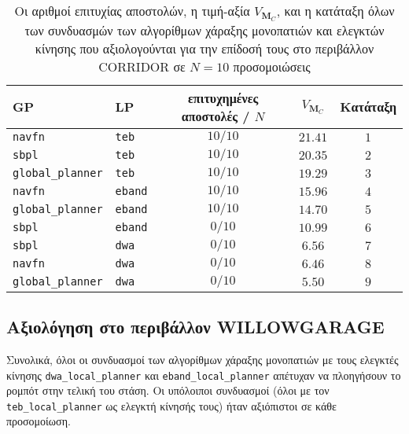\begin{table}\centering
\renewcommand{\arraystretch}{1.3}
\begin{tabular}{llccc}
  GP                        & LP              & επιτυχημένες αποστολές / $N$ & $V_{\bm{M}_C}$ & Κατάταξη \\ \toprule
  \texttt{navfn}            & \texttt{teb}    & $10/10$                      & $21.41$        & $1$      \\
  \texttt{sbpl}             & \texttt{teb}    & $10/10$                      & $20.35$        & $2$      \\
  \texttt{global\_planner}  & \texttt{teb}    & $10/10$                      & $19.29$        & $3$      \\
  \texttt{navfn}            & \texttt{eband}  & $10/10$                      & $15.96$        & $4$      \\
  \texttt{global\_planner}  & \texttt{eband}  & $10/10$                      & $14.70$        & $5$      \\
  \texttt{sbpl}             & \texttt{eband}  & $0/10$                       & $10.99$        & $6$      \\
  \texttt{sbpl}             & \texttt{dwa}    & $0/10$                       & $6.56$         & $7$      \\
  \texttt{navfn}            & \texttt{dwa}    & $0/10$                       & $6.46$         & $8$      \\
  \texttt{global\_planner}  & \texttt{dwa}    & $0/10$                       & $5.50$         & $9$      \\ \bottomrule
\end{tabular}
\caption{\small Οι αριθμοί επιτυχίας αποστολών, η τιμή-αξία $V_{\bm{M}_C}$, και
         η κατάταξη όλων των συνδυασμών των αλγορίθμων χάραξης μονοπατιών και
         ελεγκτών κίνησης που αξιολογούνται για την επίδοσή τους στο
         περιβάλλον CORRIDOR σε $N=10$ προσομοιώσεις}
\label{tbl:rank_corridor}
\end{table}


\subsection{Αξιολόγηση στο περιβάλλον WILLOWGARAGE}
  \label{subsection:02_01_04:03}

Συνολικά, όλοι οι συνδυασμοί των αλγορίθμων χάραξης μονοπατιών με τους
ελεγκτές κίνησης \texttt{dwa\_local\_planner} και \texttt{eband\_local\_planner}
απέτυχαν να πλοηγήσουν το ρομπότ στην τελική του στάση. Οι υπόλοιποι συνδυασμοί
(όλοι με τον \texttt{teb\_local\_planner} ως ελεγκτή κίνησής τους) ήταν
αξιόπιστοι σε κάθε προσομοίωση.

